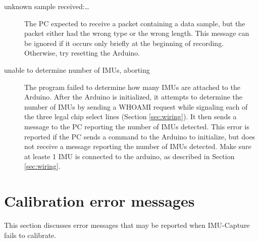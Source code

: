 \documentclass[11pt,letterpaper,article,oneside]{memoir}
\newcommand{\name}{IMU-Capture}
\begin{document}
\begin{description}
\item[unknown sample received:\dots]
The PC expected to receive a packet containing a data sample, but the packet
either had the wrong type or the wrong length. This message can be ignored if it
occurs only briefly at the beginning of recording. Otherwise, try resetting the
Arduino.

\item[unable to determine number of IMUs, aborting]
The program failed to determine how many IMUs are attached to the Arduino. After
the Arduino is initialized, it attempts to determine the number of IMUs by
sending a WHOAMI request while signaling each of the three legal chip select
lines (Section \ref{sec:wiring}). It then sends a message to the PC reporting the
number of IMUs detected. This error is reported if the PC sends a
command to the Arduino to initialize, but does not receive a message reporting
the number of IMUs detected.
\genericFix{}
Make sure at leaste 1 IMU is connected to the arduino, as described in Section
\ref{sec:wiring}.

\end{description}

\section{Calibration error messages}
\label{sec:calibErrorMessages}

This section discusses error messages that may be reported when \name{} fails
to calibrate.
\end{document}
